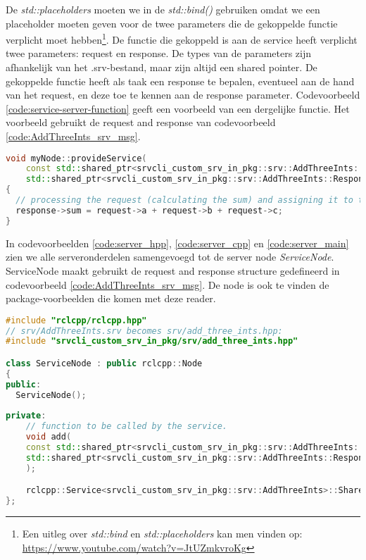 De \textit{std::placeholders} moeten we in de \textit{std::bind()} gebruiken omdat we een placeholder moeten geven voor de twee parameters die de gekoppelde functie verplicht moet hebben\footnote{Een uitleg over \textit{std::bind} en \textit{std::placeholders} kan men vinden op: \url{https://www.youtube.com/watch?v=JtUZmkvroKg}}. De functie die gekoppeld is aan de service heeft verplicht twee parameters: request en response. De types van de parameters zijn afhankelijk van het .srv-bestand, maar zijn altijd een shared pointer. De gekoppelde functie heeft als taak een response te bepalen, eventueel aan de hand van het request, en deze toe te kennen aan de response parameter. Codevoorbeeld \ref{code:service-server-function} geeft een voorbeeld van een dergelijke functie. Het voorbeeld gebruikt de request and response van codevoorbeeld \ref{code:AddThreeInts_srv_msg}.

\begin{lstlisting}[language=C++, caption={Een voorbeeld van een service-functie.}, firstnumber=0, label={code:service-server-function}]
void myNode::provideService(
    const std::shared_ptr<srvcli_custom_srv_in_pkg::srv::AddThreeInts::Request> request,
    std::shared_ptr<srvcli_custom_srv_in_pkg::srv::AddThreeInts::Response> response )
{
  // processing the request (calculating the sum) and assigning it to the response:
  response->sum = request->a + request->b + request->c;
}
\end{lstlisting}

\noindent In codevoorbeelden  \ref{code:server_hpp},  \ref{code:server_cpp} en \ref{code:server_main} zien we alle serveronderdelen samengevoegd tot de server node \textit{ServiceNode}. ServiceNode maakt gebruikt de request and response structure gedefineerd in codevoorbeeld \ref{code:AddThreeInts_srv_msg}. De node is ook te vinden de package-voorbeelden die komen met deze reader.

\begin{lstlisting}[language=C++, caption={ServiceNode.hpp}, firstnumber=0, label={code:server_hpp}]
#include "rclcpp/rclcpp.hpp"
// srv/AddThreeInts.srv becomes srv/add_three_ints.hpp:
#include "srvcli_custom_srv_in_pkg/srv/add_three_ints.hpp"

class ServiceNode : public rclcpp::Node
{
public:
  ServiceNode();
  
private:
    // function to be called by the service.
    void add(
    const std::shared_ptr<srvcli_custom_srv_in_pkg::srv::AddThreeInts::Request> request,
    std::shared_ptr<srvcli_custom_srv_in_pkg::srv::AddThreeInts::Response> response
    );

    rclcpp::Service<srvcli_custom_srv_in_pkg::srv::AddThreeInts>::SharedPtr service_;
};
\end{lstlisting}


